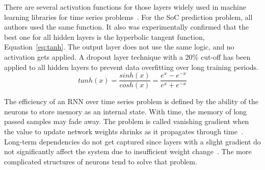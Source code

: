 %
%
There are several activation functions for those layers widely used in machine learning libraries for time series problems~\cite{amidi_cs_2018}.
For the SoC prediction problem, all authors used the same function.
It also was experimentally confirmed that the best one for all hidden layers is the hyperbolic tangent function, \mbox{Equation~\ref{eq:tanh}}.
The output layer does not use the same logic, and no activation gets applied.
A dropout layer technique with a 20\% cut-off has been applied to all hidden layers to prevent data overfitting over long training periods.
\begin{equation}
    tanh(x) = \frac{sinh(x)}{cosh(x)}=\frac{e^x-e^{-x}}{e^x+e^{-x}}
    \label{eq:tanh}
\end{equation}
%
%

%
The efficiency of an RNN over time series problem is defined by the ability of the neurons to store memory as an internal state.
With time, the memory of long passed samples may fade away.
The problem is called vanishing gradient when the value to update network weights shrinks as it propagates through time~\cite{rasifaghihi_predictive_2020}.
Long-term dependencies do not get captured since layers with a slight gradient do not significantly affect the system due to insufficient weight change~\cite{rasifaghihi_predictive_2020,hochreiter_vanishing_1998}.
The more complicated structures of neurons tend to solve that problem.

